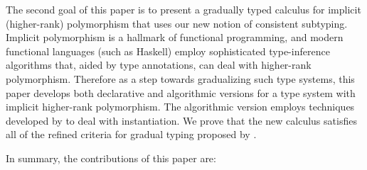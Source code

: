 
\begin{comment}
The new definition of consistent subtyping provides novel insights
with respect to previous polymorphic gradual type systems, which did
not not employ consistent subtyping. For instance both Ahmed et
al. (in the Polymorphic Blame calculus) (2011) and Igarashi et
al. (2017) define notions of \emph{compatibility} that are used
instead of consistent subtyping. We argue that Ahmed et al.'s notion
of compatibility is too permissive (i.e. too many programs are allowed
to type-check), and that Igarashi et al.'s notion of compatibility is
too conservative (i.e. programs that should type check are rejected).
\end{comment}

\begin{comment}
To further validate our revised notion of consistent subtyping, we
show that it coincides with the notion of consistent subtyping for an
extension of Garcia et al.'s \emph{Abstracting Gradual Typing} (AGT)
(2016) with polymorphism.
\end{comment}

The second goal of this paper is to present a gradually typed calculus for
implicit (higher-rank) polymorphism that uses our new notion of consistent
subtyping. Implicit polymorphism is a hallmark of functional programming, and
modern functional languages (such as Haskell) employ sophisticated
type-inference algorithms that, aided by type annotations, can deal with
higher-rank polymorphism. Therefore as a step towards gradualizing such type
systems, this paper develops both declarative and algorithmic versions for a
type system with implicit higher-rank polymorphism. The algorithmic version
employs techniques developed by \citet{dunfield2013complete} to deal with
instantiation. We prove that the new calculus satisfies all of the refined
criteria for gradual typing proposed by \citet{siek2015refined}.

In summary, the contributions of this paper are:

